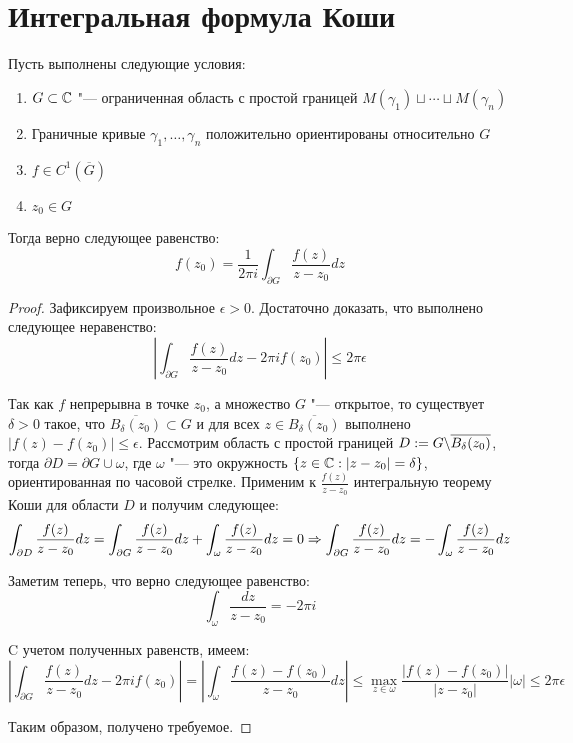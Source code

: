 \section{Интегральная формула Коши}

\begin{theorem}
	Пусть выполнены следующие условия:
	\begin{enumerate}
		\item $G \subset \mathbb{C}$ "--- ограниченная область с простой границей $M(\gamma_1) \sqcup \dotsb \sqcup M(\gamma_n)$
		
		\item Граничные кривые $\gamma_1, \dotsc, \gamma_n$ положительно ориентированы относительно $G$
		
		\item $f \in C^1(\overline{G})$
		
		\item $z_0 \in G$
	\end{enumerate}
	
	Тогда верно следующее равенство:
	\[f(z_0) = \frac{1}{2\pi i}\int_{\partial G}\frac{f(z)}{z - z_0}dz\]
\end{theorem}

\begin{proof}
	Зафиксируем произвольное $\epsilon > 0$. Достаточно доказать, что выполнено следующее неравенство:
	\[\left|\int_{\partial G}\frac{f(z)}{z - z_0}dz - 2\pi if(z_0)\right| \le 2\pi\epsilon\]
	
	Так как $f$ непрерывна в точке $z_0$, а множество $G$ "--- открытое, то существует $\delta > 0$ такое, что $\overline{B_\delta(z_0)} \subset G$ и для всех $z \in \overline{B_\delta(z_0)}$ выполнено $|f(z) - f(z_0)| \le \epsilon$. Рассмотрим область с простой границей $D := G \backslash \overline{B_\delta(z_0)}$, тогда $\partial D = \partial G \cup \omega$, где $\omega$ "--- это окружность $\{z \in \mathbb{C}: |z - z_0| = \delta\}$, ориентированная по часовой стрелке. Применим к $\frac{f(z)}{z - z_0}$ интегральную теорему Коши для области $D$ и получим следующее:
	\[\int_{\partial D}\frac{f(z)}{z - z_0}dz = \int_{\partial G}\frac{f(z)}{z - z_0}dz + \int_{\omega}\frac{f(z)}{z - z_0}dz = 0 \Rightarrow \int_{\partial G}\frac{f(z)}{z - z_0}dz = -\int_{\omega}\frac{f(z)}{z - z_0}dz\]
	
	Заметим теперь, что верно следующее равенство:
	\[\int_{\omega}\frac{dz}{z - z_0} = -2\pi i\]
	
	C учетом полученных равенств, имеем:
	\[\left|\int_{\partial G}\frac{f(z)}{z - z_0}dz - 2\pi if(z_0)\right| = \left|\int_{\omega}\frac{f(z) - f(z_0)}{z - z_0}dz\right| \le \max_{z \in \omega}\frac{|f(z) - f(z_0)|}{|z - z_0|}|\omega| \le 2\pi\epsilon\]
	
	Таким образом, получено требуемое.
\end{proof}

